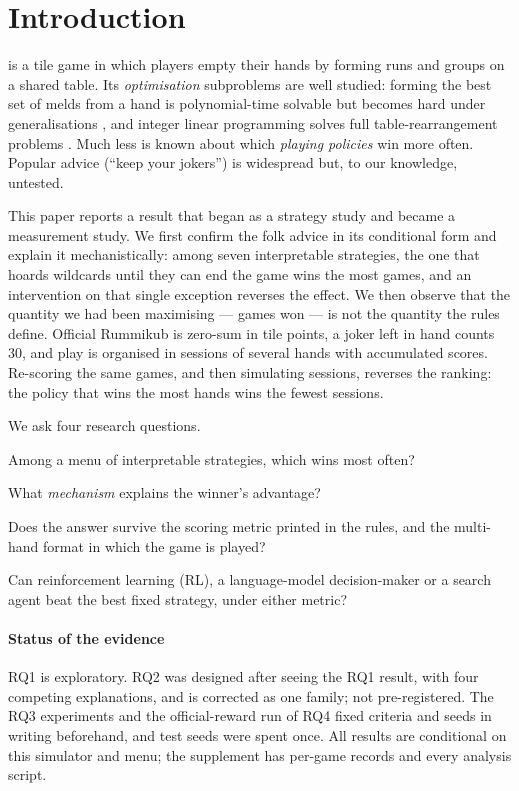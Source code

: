 \documentclass[10pt,journal,compsoc]{IEEEtran}
\begin{document}
\section{Introduction}
 is a tile game in which players empty their hands by forming runs and groups on a shared table. Its \emph{optimisation} subproblems are well studied: forming the best set of melds from a hand is polynomial-time solvable but becomes hard under generalisations \cite{vanrijn2016}, and integer linear programming solves full table-rearrangement problems \cite{denhertog2006}. Much less is known about which \emph{playing policies} win more often. Popular advice (``keep your jokers'') is widespread but, to our knowledge, untested.

This paper reports a result that began as a strategy study and became a measurement study. We first confirm the folk advice in its conditional form and explain it mechanistically: among seven interpretable strategies, the one that hoards wildcards until they can end the game wins the most games, and an intervention on that single exception reverses the effect. We then observe that the quantity we had been maximising --- games won --- is not the quantity the rules define. Official Rummikub is zero-sum in tile points, a joker left in hand counts $30$, and play is organised in sessions of several hands with accumulated scores. Re-scoring the same games, and then simulating sessions, reverses the ranking: the policy that wins the most hands wins the fewest sessions.

We ask four research questions.
\begin{description}\itemsep0pt
\item[RQ1] Among a menu of interpretable strategies, which wins most often?
\item[RQ2] What \emph{mechanism} explains the winner's advantage?
\item[RQ3] Does the answer survive the scoring metric printed in the rules, and the multi-hand format in which the game is played?
\item[RQ4] Can reinforcement learning (RL), a language-model decision-maker or a search agent beat the best fixed strategy, under either metric?
\end{description}

\paragraph*{Status of the evidence}
RQ1 is exploratory. RQ2 was designed after seeing the RQ1 result, with four competing explanations, and is corrected as one family; not pre-registered. The RQ3 experiments and the official-reward run of RQ4 fixed criteria and seeds in writing beforehand, and test seeds were spent once. All results are conditional on this simulator and menu; the supplement has per-game records and every analysis script.
\end{document}
